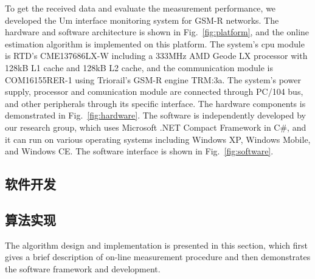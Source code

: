 To get the received data and evaluate the measurement performance, we developed the Um interface monitoring system for GSM-R networks. The hardware and software architecture is shown in Fig.~\ref{fig:platform}, and the online estimation algorithm is implemented on this platform. The system's cpu module is RTD's CME137686LX-W including a 333MHz AMD Geode LX processor with 128kB L1 cache and 128kB L2 cache, and the communication module is COM16155RER-1 using Triorail's GSM-R engine TRM:3a. The system's power supply, processor and comunication module are connected through PC/104 bus, and other peripherals through its specific interface. The hardware components is demonstrated in Fig.~\ref{fig:hardware}. The software is independently developed by our research group, which uses Microsoft .NET Compact Framework in C\#, and it can run on various operating systems including Windows XP, Windows Mobile, and Windows CE. The software interface is shown in Fig.~\ref{fig:software}.

\begin{figure}[!htp]
\centering
{}
    \hspace{1cm}
\end{figure}

\subsection{软件开发}
\label{sec:softwaregsmmr}


\subsection{算法实现}
\label{sec:alggsmr}

The algorithm design and implementation is presented in this section, which first gives a brief description of on-line measurement procedure and then demonstrates the software framework and development.

